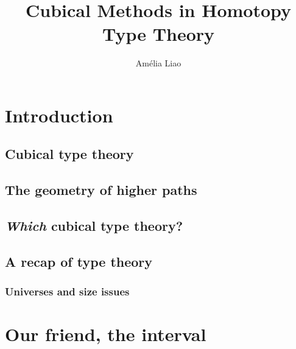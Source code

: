 \title{Cubical Methods in Homotopy Type Theory}
\author{Am\'elia Liao}




\frontmatter
\thetitlepage
\tableofcontents

\mainmatter


\chapter{Introduction}


\section{Cubical type theory}


\section{The geometry of higher paths}


\section{\emph{Which} cubical type theory?}


\section{A recap of type theory}


\subsection{Universes and size issues}


\chapter{Our friend, the interval}


\backmatter
\printbibliography



